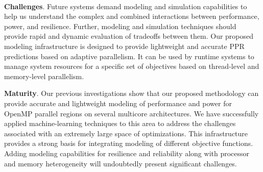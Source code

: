 \documentclass{article}  %
\begin{document}
\vspace{10pt}

   \\
\textbf{Challenges}. 
Future systems demand modeling and simulation capabilities to help us
understand the complex and combined interactions between performance,
power, and resilience. Further, modeling and simulation techniques
should provide rapid and dynamic evaluation of tradeoffs between
them. Our proposed modeling infrastructure is designed to provide
lightweight and accurate PPR predictions based on adaptive
parallelism. It can be used by runtime systems to manage system
resources for a specific set of objectives based on thread-level and
memory-level parallelism.  


\noindent\textbf{Maturity}. 
Our previous investigations show that our
proposed methodology can provide accurate and lightweight modeling 
of performance and power for OpenMP parallel regions on several
multicore architectures. We have successfully applied
machine-learning techniques to this area to address the challenges
associated with an extremely large space of optimizations. This 
infrastructure provides a strong basis for integrating
modeling of different objective functions. Adding modeling
capabilities for resilience and reliability along with processor and
memory heterogeneity will undoubtedly present significant challenges. 

\end{document}
